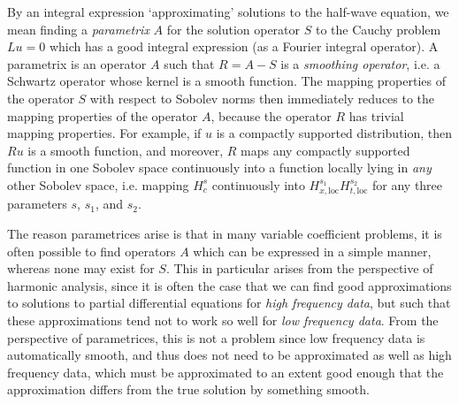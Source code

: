 \documentclass{article}
\theoremstyle{plain}
\theoremstyle{remark}
\theoremstyle{definition}
\begin{document}
By an integral expression `approximating' solutions to the half-wave equation, we mean finding a \emph{parametrix} $A$ for the solution operator $S$ to the Cauchy problem $Lu = 0$ which has a good integral expression (as a Fourier integral operator). A parametrix is an operator $A$ such that $R = A - S$ is a \emph{smoothing operator}, i.e. a Schwartz operator whose kernel is a smooth function. The mapping properties of the operator $S$ with respect to Sobolev norms then immediately reduces to the mapping properties of the operator $A$, because the operator $R$ has trivial mapping properties. For example, if $u$ is a compactly supported distribution, then $Ru$ is a smooth function, and moreover, $R$ maps any compactly supported function in one Sobolev space continuously into a function locally lying in \emph{any} other Sobolev space, i.e. mapping $H^s_c$ continuously into $H^{s_1}_{x,\text{loc}} H^{s_2}_{t,\text{loc}}$ for any three parameters $s$, $s_1$, and $s_2$.

The reason parametrices arise is that in many variable coefficient problems, it is often possible to find operators $A$ which can be expressed in a simple manner, whereas none may exist for $S$. This in particular arises from the perspective of harmonic analysis, since it is often the case that we can find good approximations to solutions to partial differential equations for \emph{high frequency data}, but such that these approximations tend not to work so well for \emph{low frequency data}. From the perspective of parametrices, this is not a problem since low frequency data is automatically smooth, and thus does not need to be approximated as well as high frequency data, which must be approximated to an extent good enough that the approximation differs from the true solution by something smooth.

\end{document}
